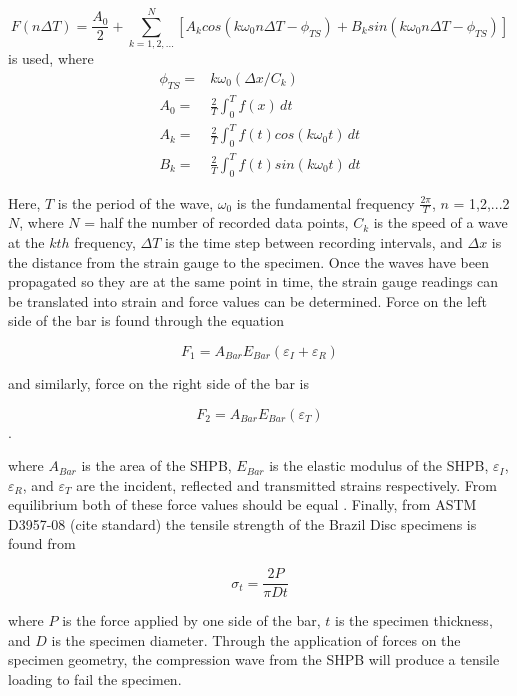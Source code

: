 \documentclass[12pt]{article}
\begin{document}
\begin{equation}
F(n\Delta T) = \frac{A_0}{2} + \sum\limits_{k=1,2,...}^N [A_k cos(k \omega_0 n \Delta T - \phi_{TS}) + B_k sin(k\omega_0 n\Delta T - \phi_{TS})]
\end{equation}
is used, where 
\begin{align*}
\phi_{TS} =& k\omega_0(\Delta x/C_k) \\
A_0 =& \frac{2}{T} \int_0^T \! f(x) \, dt\\
A_k =& \frac{2}{T} \int_0^T \! f(t)cos(k\omega_0t) \, dt\\
B_k =& \frac{2}{T} \int_0^T \! f(t)sin(k\omega_0t) \, dt
\end{align*}

Here, $T$ is the period of the wave, $\omega_0$ is the fundamental frequency $\frac{2\pi}{T}$, $n$ = 1,2,...2$N$, where $N$ = half the number of recorded data points, $C_k$ is the speed of a wave at the $kth$ frequency, $\Delta T$ is the time step between recording intervals, and $\Delta x$ is the distance from the strain gauge to the specimen\cite{Gama}. Once the waves have been propagated so they are at the same point in time, the strain gauge readings can be translated into strain and force values can be determined. Force on the left side of the bar is found through the equation 

\begin{equation}
F_1 = A_{Bar}E_{Bar}(\varepsilon_I + \varepsilon_R)
\end{equation}

and similarly, force on the right side of the bar is

\begin{equation}
F_2 = A_{Bar}E_{Bar}(\varepsilon_T)
\end{equation}.

where $A_{Bar}$ is the area of the SHPB, $E_{Bar}$ is the elastic modulus of the SHPB, $\varepsilon_I$, $\varepsilon_R$, and $\varepsilon_T$ are the incident, reflected and transmitted strains respectively. From equilibrium both of these force values should be equal . Finally, from ASTM D3957-08 (cite standard) the tensile strength of the Brazil Disc specimens is found from

\begin{equation}
\sigma_t = \frac{2P}{\pi Dt}
\label{eq:stress}
\end{equation}

where $P$ is the force applied by one side of the bar, $t$ is the specimen thickness, and $D$ is the specimen diameter. Through the application of forces on the specimen geometry, the compression wave from the SHPB will produce a tensile loading to fail the specimen.
\end{document}
